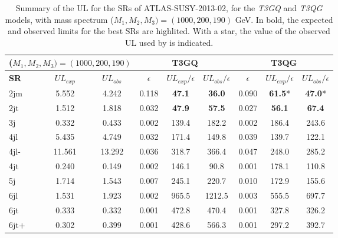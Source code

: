 \documentclass[epj,nopacs,fleqn]{svjour}
\begin{document}
\begin{table}[h]
\centering
\renewcommand\arraystretch{1.3} 
\scriptsize
\begin{tabular}{ l c c    c c c  |  c c c  }
\toprule \toprule
\multicolumn{3}{c}{($M_1,M_2,M_3) = (1000,200,190)$} & \multicolumn{3}{c}{ \textbf{T3GQ}} & \multicolumn{3}{c}{ \textbf{T3QG}} \\  \toprule 
\textbf{SR} & $UL_{exp}$ & $UL_{obs}$ & $\epsilon$ &  $UL_{exp}/\epsilon$ & $UL_{obs}/\epsilon$ & $\epsilon$ & $UL_{exp}/ \epsilon$ & $UL_{obs}/ \epsilon$ \\
2jm & 5.552 &  4.242 &  0.118  & \textbf{47.1} &  \textbf{36.0}  &  0.090 &  \textbf{61.5}*  & \textbf{47.0}*\\
2jt  & 1.512  & 1.818 &  0.032  & \textbf{47.9} &  \textbf{57.5}  &  0.027 &  \textbf{56.1}  & \textbf{67.4} \\
3j &  0.332 &  0.433  & 0.002 &  139.4 &  182.2  &  0.002 &  186.4 &  243.6 \\ 
4jl  & 5.435 &  4.749  & 0.032  & 171.4  & 149.8  &  0.039 &  139.7  & 122.1 \\
4jl-  & 11.561 &  13.292 &  0.036  & 318.7 &  366.4  &  0.047 &  248.0 &  285.2 \\
4jt  & 0.240  & 0.149  & 0.002  & 146.1  & 90.8 &   0.001  & 178.1  & 110.8 \\
5j  & 1.714  & 1.543  & 0.007 &  245.1 &  220.7  &  0.010  & 172.9  & 155.6 \\
6jl  & 1.531  & 1.923  & 0.002  & 965.5 &  1212.5  & 0.003  & 555.5 &  697.7 \\
6jt &  0.333  & 0.332 &  0.001  & 472.8  & 470.4 &  0.001 &  327.8  & 326.2 \\
6jt+  & 0.302 &  0.399 &  0.001  & 428.6  & 566.3  & 0.001  & 297.2  & 392.7 \\
\bottomrule \bottomrule
\end{tabular}
\caption{Summary of the UL for the SRs of ATLAS-SUSY-2013-02, for the \textit{T3GQ} and \textit{T3QG} models, with mass spectrum ($M_1,M_2,M_3) = (1000,200,190)$ GeV. In bold, the expected and observed limits for the best SRs are highlited. With a star, the value of the observed UL used by \SMO is indicated.}
\label{ATLAS02_UL}
\end{table}
\end{document}
